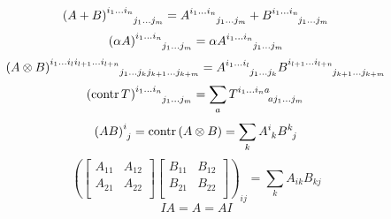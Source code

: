 \documentclass[stu, babel, american, biblatex, a4paper, leqno, draftall]{apa7}
\begin{document}
\begin{equation}\label{Tensor:Sum}
    \tensor{\left(A+B\right)}{
        ^{i_1}^{\dots}^{i_n}
        _{j_1}_{\dots}_{j_m}
    }
    =
    \tensor{A}{
        ^{i_1}^{\dots}^{i_n}
        _{j_1}_{\dots}_{j_m}
    }
    +
    \tensor{B}{
        ^{i_1}^{\dots}^{i_n}
        _{j_1}_{\dots}_{j_m}
    }
\end{equation}
\begin{equation}\label{Tensor:Product:Scalar}
    \tensor{\left(\alpha A\right)}{
        ^{i_1}^{\dots}^{i_n}
        _{j_1}_{\dots}_{j_m}
    }
    =
    \alpha
    \tensor{A}{
        ^{i_1}^{\dots}^{i_n}
        _{j_1}_{\dots}_{j_m}
    }
\end{equation}
\begin{equation}\label{Tensor:Product:Tensor}
    \tensor{\left(A\otimes B\right)}{
        ^{i_1}^{\dots}^{i_l}^{i_{l+1}}^{\dots}^{i_{l+n}}
        _{j_1}_{\dots}_{j_k}_{j_{k+1}}_{\dots}_{j_{k+m}}
    }
    =
    \tensor{A}{
        ^{i_1}^{\dots}^{i_l}
        _{j_1}_{\dots}_{j_k}
    }
    \tensor{B}{
        ^{i_{l+1}}^{\dots}^{i_{l+n}}
        _{j_{k+1}}_{\dots}_{j_{k+m}}
    }
\end{equation}
\begin{equation}\label{Tensor:Contraction}
    \tensor{\left(\contr{\tensor{T}{}}\right)}{
        ^{i_1}^{\dots}^{i_n}
        _{j_1}_{\dots}_{j_m}
    }
    =
    \sum_a{\tensor{T}{
        ^{i_1}^{\dots}^{i_n}^a
        _a_{j_1}_{\dots}_{j_m}
    }}
\end{equation}
\begin{equation}\label{Matrix:Product}
    \tensor{\left(AB\right)}{^i_j}
    =\contr{\left(A\otimes B\right)}
    =\sum_k\tensor{A}{^i_k}\tensor{B}{^k_j}
\end{equation}
\begin{equation}\label{Matrix:Product:Block}
    \left(\begin{bmatrix}
        A_{11} & A_{12} \\
        A_{21} & A_{22} \\
    \end{bmatrix}
    \begin{bmatrix}
        B_{11} & B_{12} \\
        B_{21} & B_{22} \\
    \end{bmatrix}\right)_{ij}
    =
    \sum_k A_{ik} B_{kj}
\end{equation}
\begin{equation}\label{Matrix:Identity}
    IA = A = AI
\end{equation}
\end{document}
